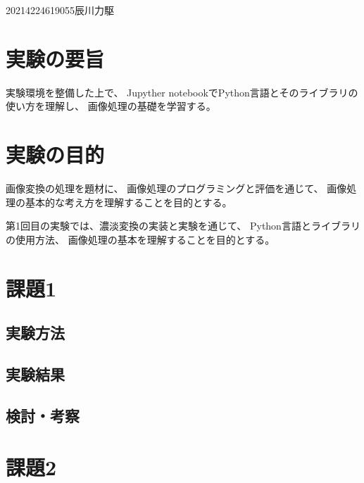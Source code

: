 \documentclass[12pt]{jarticle}
\begin{document}
{2021}{4}{22}{4619055}{辰川力駆}
\section{実験の要旨}

実験環境を整備した上で、
Jupyther notebookでPython言語とそのライブラリの使い方を理解し、
画像処理の基礎を学習する。

\section{実験の目的}

画像変換の処理を題材に、
画像処理のプログラミングと評価を通じて、
画像処理の基本的な考え方を理解することを目的とする。

第1回目の実験では、濃淡変換の実装と実験を通じて、
Python言語とライブラリの使用方法、
画像処理の基本を理解することを目的とする。

\section{課題1}
\subsection{実験方法}
\subsection{実験結果}
\subsection{検討・考察}

\section{課題2}
\end{document}
